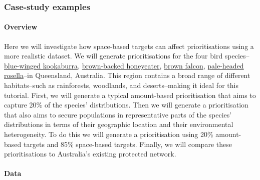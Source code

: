 \documentclass[11pt,]{article}
\begin{document}
\subsubsection{Case-study examples}\label{case-study-examples}

\paragraph{Overview}\label{overview}

Here we will investigate how space-based targets can affect
prioritisations using a more realistic dataset. We will generate
prioritisations for the four bird species--
\href{http://www.birdlife.org/datazone/speciesfactsheet.php?id=1092\&gclid=CjwKEAiApYGyBRC-g_jIstuduV8SJABCEzhZoONUy8VlwRZqeFB1Z5M03CjyneIvX8KdVKIPZvckrRoCgJDw_wcB}{blue-winged
kookaburra},
\href{http://www.birdlife.org/datazone/species/factsheet/22704394?gclid=CjwKEAiApYGyBRC-g_jIstuduV8SJABCEzhZHxCTcR38YnFlhePYt19gD31lqxxwrMmtIuWFhUwLmRoCGJjw_wcB}{brown-backed
honeyeater},
\href{http://www.birdlife.org/datazone/speciesfactsheet.php?id=3588}{brown
falcon},
\href{http://www.birdlife.org/datazone/speciesfactsheet.php?id=1466}{pale-headed
rosella}--in Queensland, Australia. This region contains a broad range
of different habitats--such as rainforests, woodlands, and
deserts--making it ideal for this tutorial. First, we will generate a
typical amount-based prioritisation that aims to capture 20\% of the
species' distributions. Then we will generate a prioritisation that also
aims to secure populations in representative parts of the species'
distributions in terms of their geographic location and their
environmental heterogeneity. To do this we will generate a
prioritisation using 20\% amount-based targets and 85\% space-based
targets. Finally, we will compare these prioritisations to Australia's
existing protected network.

\paragraph{Data}\label{data-2}
\end{document}
